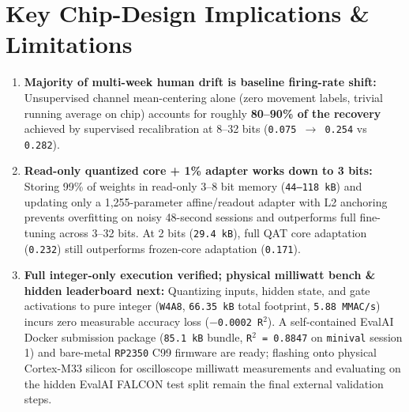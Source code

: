 \documentclass[11pt,a4paper]{article}
\begin{document}
\begin{table}[htbp]
\centering
\small
{}
\end{table}
\section{Key Chip-Design Implications \& Limitations}
\begin{enumerate}
\item \textbf{Majority of multi-week human drift is baseline firing-rate shift:} Unsupervised channel mean-centering alone (zero movement labels, trivial running average on chip) accounts for roughly \textbf{80--90\% of the recovery} achieved by supervised recalibration at 8--32 bits (\texttt{0.075 $\to$ 0.254} vs \texttt{0.282}).
\item \textbf{Read-only quantized core + 1\% adapter works down to 3 bits:} Storing 99\% of weights in read-only 3--8 bit memory (\texttt{44--118 kB}) and updating only a 1,255-parameter affine/readout adapter with L2 anchoring prevents overfitting on noisy 48-second sessions and outperforms full fine-tuning across 3--32 bits. At 2 bits (\texttt{29.4 kB}), full QAT core adaptation (\texttt{0.232}) still outperforms frozen-core adaptation (\texttt{0.171}).
\item \textbf{Full integer-only execution verified; physical milliwatt bench \& hidden leaderboard next:} Quantizing inputs, hidden state, and gate activations to pure integer (\texttt{W4A8}, \texttt{66.35 kB} total footprint, \texttt{5.88 MMAC/s}) incurs zero measurable accuracy loss (\texttt{$-$0.0002 R$^2$}). A self-contained EvalAI Docker submission package (\texttt{85.1 kB} bundle, \texttt{R$^2$ = 0.8847} on \texttt{minival} session 1) and bare-metal \texttt{RP2350} C99 firmware are ready; flashing onto physical Cortex-M33 silicon for oscilloscope milliwatt measurements and evaluating on the hidden EvalAI FALCON test split remain the final external validation steps.
\end{enumerate}
\end{document}
